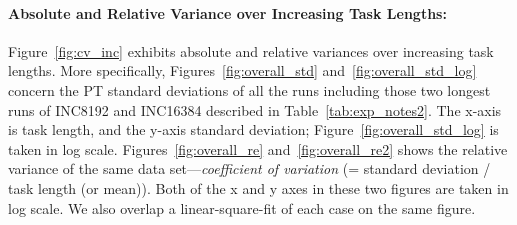 \paragraph{Absolute and Relative Variance over Increasing Task Lengths:}
Figure~\ref{fig:cv_inc} exhibits absolute and relative variances over increasing task lengths. 
More specifically, Figures~\ref{fig:overall_std} and~\ref{fig:overall_std_log} 
concern the PT standard deviations of all the runs including those two longest runs of INC8192 and INC16384 described in Table~\ref{tab:exp_notes2}. 
The x-axis is task length, and the y-axis standard deviation; Figure~\ref{fig:overall_std_log} is taken in log scale.
Figures~\ref{fig:overall_re} and~\ref{fig:overall_re2} shows 
the relative variance of the same data set---{\em coefficient of variation} (= standard deviation 
/ task length (or mean)). Both of the x and y axes in these two figures are taken in log scale. 
We also overlap a linear-square-fit of each case on the same figure. 


